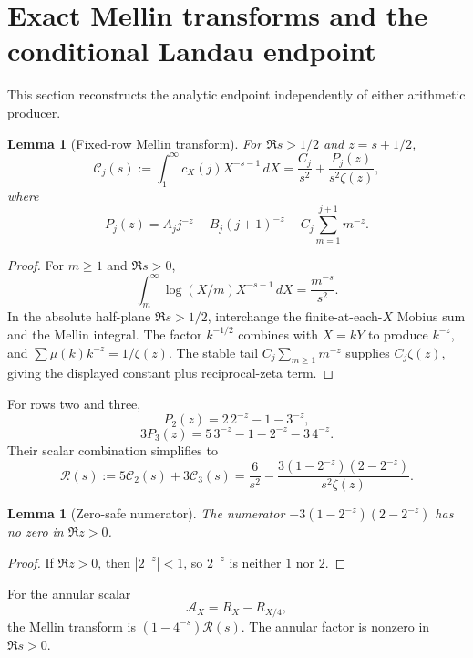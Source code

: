\documentclass[11pt]{article}
\newtheorem{lemma}[theorem]{Lemma}
\newcommand{\1}{\mathbf 1}
\begin{document}
\section{Exact Mellin transforms and the conditional Landau endpoint}

This section reconstructs the analytic endpoint independently of either arithmetic producer.

\begin{lemma}[Fixed-row Mellin transform]
For $\Re s>1/2$ and $z=s+1/2$,
\[
\mathcal C_j(s):=\int_1^\infty c_X(j)X^{-s-1}\,dX
=\frac{C_j}{s^2}+\frac{P_j(z)}{s^2\zeta(z)},
\]
where
\[
P_j(z)=A_jj^{-z}-B_j(j+1)^{-z}-C_j\sum_{m=1}^{j+1}m^{-z}.
\]
\end{lemma}
\begin{proof}
For $m\ge1$ and $\Re s>0$,
\[
\int_m^\infty \log(X/m)X^{-s-1}\,dX=\frac{m^{-s}}{s^2}.
\]
In the absolute half-plane $\Re s>1/2$, interchange the finite-at-each-$X$ Mobius sum and the Mellin integral.  The factor $k^{-1/2}$ combines with $X=kY$ to produce $k^{-z}$, and $\sum\mu(k)k^{-z}=1/\zeta(z)$.  The stable tail $C_j\sum_{m\ge1}m^{-z}$ supplies $C_j\zeta(z)$, giving the displayed constant plus reciprocal-zeta term.
\end{proof}

For rows two and three,
\[
P_2(z)=2\,2^{-z}-1-3^{-z},
\]
\[
3P_3(z)=5\,3^{-z}-1-2^{-z}-3\,4^{-z}.
\]
Their scalar combination simplifies to
\begin{equation}\label{eq:scalarMellin}
\mathcal R(s):=5\mathcal C_2(s)+3\mathcal C_3(s)
=\frac6{s^2}-\frac{3(1-2^{-z})(2-2^{-z})}{s^2\zeta(z)}.
\end{equation}

\begin{lemma}[Zero-safe numerator]
The numerator $-3(1-2^{-z})(2-2^{-z})$ has no zero in $\Re z>0$.
\end{lemma}
\begin{proof}
If $\Re z>0$, then $|2^{-z}|<1$, so $2^{-z}$ is neither $1$ nor $2$.
\end{proof}

For the annular scalar
\[
\mathcal A_X=R_X-R_{X/4},
\]
the Mellin transform is $(1-4^{-s})\mathcal R(s)$.  The annular factor is nonzero in $\Re s>0$.
\end{document}
